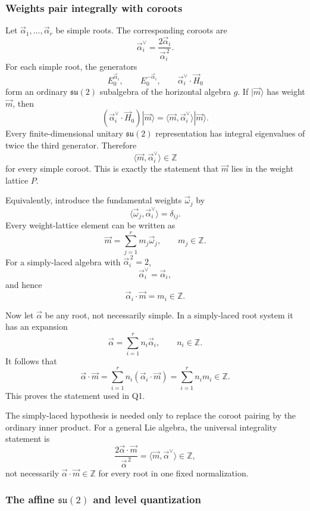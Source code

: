 \documentclass[
  10pt,
  a4paper,
  openany]{book}
\begin{document}
\subsubsection{Weights pair integrally with
coroots}\label{weights-pair-integrally-with-coroots}

Let \(\vec\alpha_1,\ldots,\vec\alpha_r\) be simple roots. The
corresponding coroots are \[
\vec\alpha_i^{\vee}
=\frac{2\vec\alpha_i}{\vec\alpha_i^{\,2}}.
\] For each simple root, the generators \[
E_0^{\vec\alpha_i},
\qquad
E_0^{-\vec\alpha_i},
\qquad
\vec\alpha_i^{\vee}\cdot\vec H_0
\] form an ordinary \(\mathfrak{su}(2)\) subalgebra of the horizontal
algebra \(g\). If \(|\vec m\rangle\) has weight \(\vec m\), then \[
(\vec\alpha_i^{\vee}\cdot\vec H_0)|\vec m\rangle
=\langle\vec m,\vec\alpha_i^{\vee}\rangle|\vec m\rangle.
\] Every finite-dimensional unitary \(\mathfrak{su}(2)\) representation
has integral eigenvalues of twice the third generator. Therefore \[
\langle\vec m,\vec\alpha_i^{\vee}\rangle
\in\mathbb Z
\] for every simple coroot. This is exactly the statement that
\(\vec m\) lies in the weight lattice \(P\).

Equivalently, introduce the fundamental weights \(\vec\omega_j\) by \[
\langle\vec\omega_j,\vec\alpha_i^{\vee}\rangle
=\delta_{ij}.
\] Every weight-lattice element can be written as \[
\vec m=\sum_{j=1}^r m_j\vec\omega_j,
\qquad
m_j\in\mathbb Z.
\] For a simply-laced algebra with \(\vec\alpha_i^{\,2}=2\), \[
\vec\alpha_i^{\vee}=\vec\alpha_i,
\] and hence \[
\vec\alpha_i\cdot\vec m=m_i\in\mathbb Z.
\]

Now let \(\vec\alpha\) be any root, not necessarily simple. In a
simply-laced root system it has an expansion \[
\vec\alpha=\sum_{i=1}^r n_i\vec\alpha_i,
\qquad
n_i\in\mathbb Z.
\] It follows that \[
\vec\alpha\cdot\vec m
=\sum_{i=1}^r n_i(\vec\alpha_i\cdot\vec m)
=\sum_{i=1}^r n_i m_i
\in\mathbb Z.
\] This proves the statement used in Q1.

The simply-laced hypothesis is needed only to replace the coroot pairing
by the ordinary inner product. For a general Lie algebra, the universal
integrality statement is \[
\frac{2\vec\alpha\cdot\vec m}{\vec\alpha^{\,2}}
=\langle\vec m,\vec\alpha^{\vee}\rangle
\in\mathbb Z,
\] not necessarily \(\vec\alpha\cdot\vec m\in\mathbb Z\) for every root
in one fixed normalization.

\subsubsection{\texorpdfstring{The affine \(\mathfrak{su}(2)\) and level
quantization}{The affine \textbackslash mathfrak\{su\}(2) and level quantization}}\label{the-affine-mathfraksu2-and-level-quantization}
\end{document}
